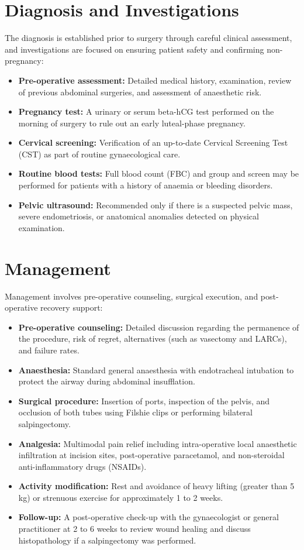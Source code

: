 \section*{Diagnosis and Investigations}
The diagnosis is established prior to surgery through careful clinical assessment, and investigations are focused on ensuring patient safety and confirming non-pregnancy:
\begin{itemize}
    \item \textbf{Pre-operative assessment:} Detailed medical history, examination, review of previous abdominal surgeries, and assessment of anaesthetic risk.
    \item \textbf{Pregnancy test:} A urinary or serum beta-hCG test performed on the morning of surgery to rule out an early luteal-phase pregnancy.
    \item \textbf{Cervical screening:} Verification of an up-to-date Cervical Screening Test (CST) as part of routine gynaecological care.
    \item \textbf{Routine blood tests:} Full blood count (FBC) and group and screen may be performed for patients with a history of anaemia or bleeding disorders.
    \item \textbf{Pelvic ultrasound:} Recommended only if there is a suspected pelvic mass, severe endometriosis, or anatomical anomalies detected on physical examination.
\end{itemize}

\section*{Management}
Management involves pre-operative counseling, surgical execution, and post-operative recovery support:
\begin{itemize}
    \item \textbf{Pre-operative counseling:} Detailed discussion regarding the permanence of the procedure, risk of regret, alternatives (such as vasectomy and LARCs), and failure rates.
    \item \textbf{Anaesthesia:} Standard general anaesthesia with endotracheal intubation to protect the airway during abdominal insufflation.
    \item \textbf{Surgical procedure:} Insertion of ports, inspection of the pelvis, and occlusion of both tubes using Filshie clips or performing bilateral salpingectomy.
    \item \textbf{Analgesia:} Multimodal pain relief including intra-operative local anaesthetic infiltration at incision sites, post-operative paracetamol, and non-steroidal anti-inflammatory drugs (NSAIDs).
    \item \textbf{Activity modification:} Rest and avoidance of heavy lifting (greater than 5 kg) or strenuous exercise for approximately 1 to 2 weeks.
    \item \textbf{Follow-up:} A post-operative check-up with the gynaecologist or general practitioner at 2 to 6 weeks to review wound healing and discuss histopathology if a salpingectomy was performed.
\end{itemize}

